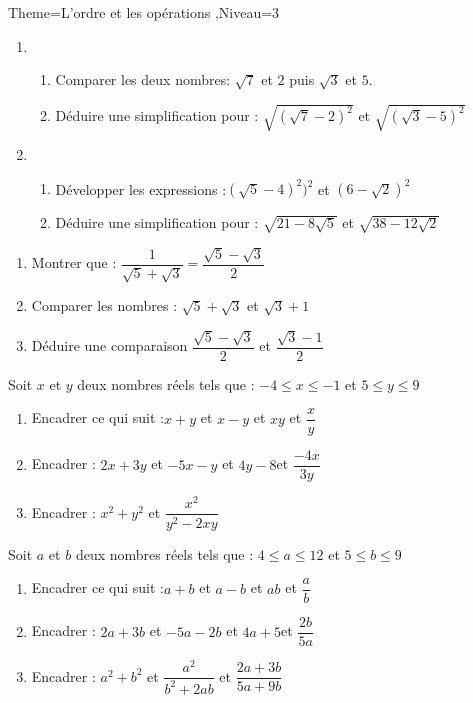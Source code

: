 \documentclass[a4paper,12pt]{article}
\begin{document}
\begin{Maquette}[Fiche]{Theme=L'ordre et les opérations ,Niveau=3}
\begin{exercice}
\begin{enumerate}
\item
\begin{enumerate}
\item Comparer les deux nombres: $\sqrt{7}$ et $2$ puis $\sqrt{3}$ et $5$.
\item Déduire une simplification pour : $\sqrt{(\sqrt{7}-2)^{2}}$ et $\sqrt{(\sqrt{3}-5)^{2}}$
\end{enumerate}
\item 
\begin{enumerate}
\item Développer les expressions :$(\sqrt{5}-4)^{2})^{2}$ et $(6-\sqrt{2})^{2}$
\item Déduire une simplification pour : 
$\sqrt{21-8\sqrt{5}}$ et $\sqrt{38-12\sqrt{2}}$
\end{enumerate}
\end{enumerate}
\end{exercice}

\begin{exercice}
\begin{enumerate}
\item Montrer que : $\dfrac{1}{\sqrt{5}+\sqrt{3}}=\dfrac{\sqrt{5}-\sqrt{3}}{2}$
\item Comparer les nombres : $\sqrt{5}+\sqrt{3}$ et $\sqrt{3}+1$
\item Déduire une comparaison $\dfrac{\sqrt{5}-\sqrt{3}}{2}$ et $\dfrac{\sqrt{3}-1}{2}$
\end{enumerate}
\end{exercice}

\begin{exercice}
Soit $x$ et $y$ deux nombres réels tels que : $-4\leq x\leq -1$ et $5\leq y\leq 9$
\begin{enumerate}
\item Encadrer ce qui suit :$x+y$ et $x-y$ et $xy$ et $\dfrac{x}{y}$
\item Encadrer : $2x+3y$ et $-5x-y$ et $4y-8$et $\dfrac{-4x}{3y}$
\item Encadrer : $x^{2}+y^{2}$ et $\dfrac{x^{2}}{y^{2}-2xy}$
\end{enumerate}
\end{exercice}

\begin{exercice}
Soit $a$ et $b$ deux nombres réels tels que : $4\leq a\leq 12$ et $5\leq b\leq 9$
\begin{enumerate}
\item Encadrer ce qui suit :$a+b$ et $a-b$ et $ab$ et $\dfrac{a}{b}$
\item Encadrer : $2a+3b$ et $-5a-2b$ et $4a+5$et $\dfrac{2b}{5a}$
\item Encadrer : $a^{2}+b^{2}$ et $\dfrac{a^{2}}{b^{2}+2ab}$ et $\dfrac{2a+3b}{5a+9b}$
\end{enumerate}
\end{exercice}


\end{Maquette}
\end{document}
